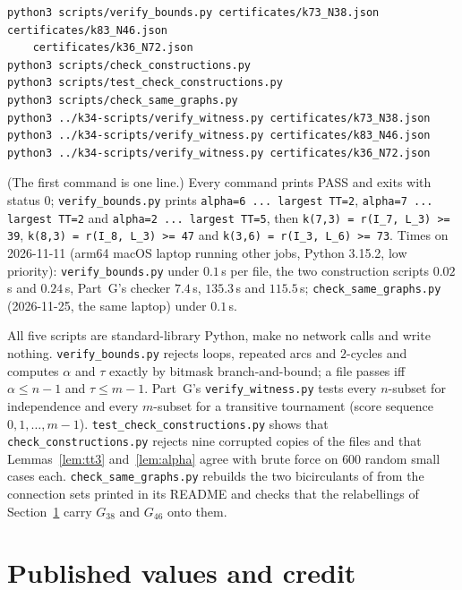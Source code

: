 \documentclass[11pt]{amsart}
\theoremstyle{plain}
\theoremstyle{definition}
\theoremstyle{remark}
\begin{document}
{\footnotesize\begin{verbatim}
python3 scripts/verify_bounds.py certificates/k73_N38.json certificates/k83_N46.json
    certificates/k36_N72.json
python3 scripts/check_constructions.py
python3 scripts/test_check_constructions.py
python3 scripts/check_same_graphs.py
python3 ../k34-scripts/verify_witness.py certificates/k73_N38.json
python3 ../k34-scripts/verify_witness.py certificates/k83_N46.json
python3 ../k34-scripts/verify_witness.py certificates/k36_N72.json
\end{verbatim}}

\noindent (The first command is one line.) Every command prints PASS and exits with status $0$;
\texttt{verify\_bounds.py} prints \verb|alpha=6 ... largest TT=2|, \verb|alpha=7 ... largest TT=2|
and \verb|alpha=2 ... largest TT=5|, then \verb|k(7,3) = r(I_7, L_3) >= 39|,
\verb|k(8,3) = r(I_8, L_3) >= 47| and \verb|k(3,6) = r(I_3, L_6) >= 73|. Times on 2026-11-11 (arm64
macOS laptop running other jobs, Python 3.15.2, low priority): \texttt{verify\_bounds.py} under
$0.1$\,s per file, the two construction scripts $0.02$\,s and $0.24$\,s, Part~G's checker $7.4$\,s,
$135.3$\,s and $115.5$\,s; \texttt{check\_same\_graphs.py} (2026-11-25, the same laptop) under
$0.1$\,s.

All five scripts are standard-library Python, make no network calls and write nothing.
\texttt{verify\_bounds.py} rejects loops, repeated arcs and $2$-cycles and computes $\alpha$ and
$\tau$ exactly by bitmask branch-and-bound; a file passes iff $\alpha\leq n-1$ and $\tau\leq m-1$.
Part~G's \texttt{verify\_witness.py} tests every $n$-subset for independence and every $m$-subset
for a transitive tournament (score sequence $0,1,\dots,m-1$).
\texttt{test\_check\_constructions.py} shows that \texttt{check\_constructions.py} rejects nine
corrupted copies of the files and that Lemmas~\ref{lem:tt3} and~\ref{lem:alpha} agree with brute
force on $600$ random small cases each. \texttt{check\_same\_graphs.py} rebuilds the two
bicirculants of \cite{Orden2} from the connection sets printed in its README and checks that the
relabellings of Section~\ref{sec:credit} carry $G_{38}$ and $G_{46}$ onto them.

\section{Published values and credit}\label{sec:credit}
\end{document}
